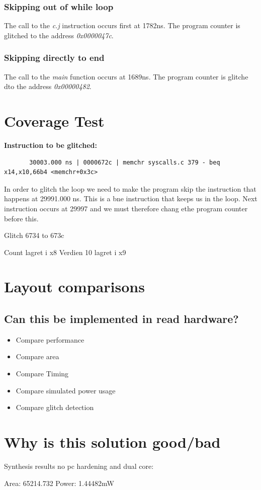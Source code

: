 \subsubsection{Skipping out of while loop}

The call to the \textit{c.j} instruction occurs first at 1782ns. The program counter is glitched to the address \textit{0x0000047c}.

\subsubsection{Skipping directly to end}

The call to the \textit{main} function occurs at 1689ns. The program counter is glitche dto the address \textit{0x00000482}.


\section{Coverage Test}
\label{sec:cov_test_result}



\textbf{Instruction to be glitched:}
\begin{lstlisting}
       30003.000 ns | 0000672c | memchr syscalls.c 379 - beq x14,x10,66b4 <memchr+0x3c>
\end{lstlisting}

In order to glitch the loop we need to make the program skip the instruction that happens at 29991.000 ns. This is a bne instruction that keeps us in the loop. Next instruction occurs at 29997 and we must therefore chang ethe program counter before this. 

Glitch 6734 to 673c

Count lagret i x8 
Verdien 10 lagret i x9

\section{Layout comparisons}

\subsection{Can this be implemented in read hardware?}
\begin{itemize}
    \item Compare performance 
    \item Compare area
    \item Compare Timing 
    \item Compare simulated power usage
    \item Compare glitch detection
\end{itemize}

\section{Why is this solution good/bad}

Synthesis results no pc hardening and dual core:

Area: 65214.732
Power: 1.44482mW
